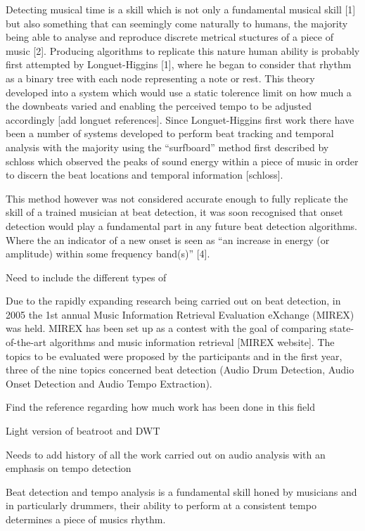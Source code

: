 \documentclass[a4paper, 11pt]{article}
\begin{document}
Detecting musical time is a skill which is not only a fundamental musical skill [1] but also something that can seemingly come naturally to humans, the majority being able to analyse and reproduce discrete metrical stuctures of a piece of music [2]. Producing algorithms to replicate this nature human ability is probably first attempted by Longuet-Higgins [1], where he began to consider that rhythm as a binary tree with each node representing a note or rest. This theory developed into a system which would use a static tolerence limit on how much a the downbeats varied and enabling the perceived tempo to be adjusted accordingly [add longuet references]. Since Longuet-Higgins first work there have been a number of systems developed to perform beat tracking and temporal analysis with the majority using the ``surfboard'' method first described by schloss which observed the peaks of sound energy within a piece of music in order to discern the beat locations and temporal information [schloss]. 

This method however was not considered accurate enough to fully replicate the skill of a trained musician at beat detection, it was soon recognised that onset detection would play a fundamental part in any future beat detection algorithms. Where the an indicator of a new onset is seen as ``an increase in energy (or amplitude) within some frequency band(s)'' [4].

Need to include the different types of 

Due to the rapidly expanding research being carried out on beat detection, in 2005 the 1st annual Music Information Retrieval Evaluation eXchange (MIREX) was held. MIREX has been set up as a contest with the goal of comparing state-of-the-art algorithms and music information retrieval [MIREX website]. The topics to be evaluated were proposed by the participants and in the first year, three of the nine topics concerned beat detection (Audio Drum Detection, Audio Onset Detection and Audio Tempo Extraction).  

Find the reference regarding how much work has been done in this field

Light version of beatroot and DWT

Needs to add history of all the work carried out on audio analysis with an emphasis on tempo detection

Beat detection and tempo analysis is a fundamental skill honed by musicians and in particularly drummers, their ability to perform at a consistent tempo determines a piece of musics rhythm. 
\end{document}
